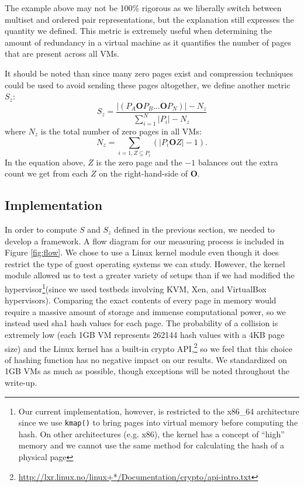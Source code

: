 \documentclass{acm_proc_article-sp}
\begin{document}
The example above may not be 100\% rigorous as we liberally switch between multiset and ordered pair representations, but the explanation still expresses the quantity we defined.  This metric is extremely useful when determining the amount of redundancy in a virtual machine as it quantifies the number of pages that are present across all VMs.

It should be noted than since many zero pages exist and compression techniques could be used to avoid sending these pages altogether\cite{live_adaptive_compress}, we define another metric $S_z$:
\begin{equation}
S_z = \frac{|(P_A \mathbf{O} P_B ... \mathbf{O} P_N)|-N_z}{\sum\limits_{i=1}^{N}|P_i|-N_z}
\end{equation}
where $N_z$ is the total number of zero pages in all VMs:
\begin{equation}
N_z = \sum\limits_{i=1,Z\subseteq P_i}\left(|P_i\mathbf{O}Z|-1\right).
\end{equation}\label{eqn:sz}
In the equation above, $Z$ is the zero page and the $-1$ balances out the extra count we get from each $Z$ on the right-hand-side of $\mathbf{O}$.

\subsection{Implementation}\label{sec:red_implementation}
In order to compute $S$ and $S_z$ defined in the previous section, we needed to develop a framework.  A flow diagram for our measuring process is included in Figure \ref{fig:flow}.  We chose to use a Linux kernel module even though it does restrict the type of guest operating systems we can study.  However, the kernel module allowed us to test a greater variety of setups than if we had modified the hypervisor\footnote{Our current implementation, however, is restricted to the x86\_64 architecture since we use {\tt kmap()} to bring pages into virtual memory before computing the hash.  On other architectures (e.g. x86), the kernel has a concept of ``high'' memory and we cannot use the same method for calculating the hash of a physical page}(since we used testbeds involving KVM, Xen, and VirtualBox hypervisors).  Comparing the exact contents of every page in memory would require a massive amount of storage and immense computational power, so we instead used sha1 hash values for each page.  The probability of a collision is extremely low (each 1GB VM represents 262144 hash values with a 4KB page size) and the Linux kernel has a built-in crypto API,\footnote{\url{http://lxr.linux.no/linux+*/Documentation/crypto/api-intro.txt}} so we feel that this choice of hashing function has no negative impact on our results.  We standardized on 1GB VMs as much as possible, though exceptions will be noted throughout the write-up.
\end{document}
